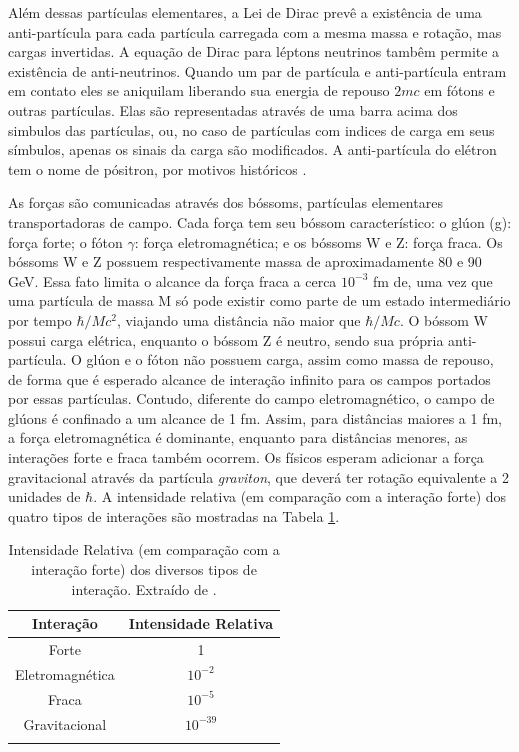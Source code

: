 Além dessas partículas elementares, a Lei de Dirac prevê a
existência de uma anti-partícula para cada partícula carregada
com a mesma massa e rotação, mas cargas invertidas. A equação de Dirac para léptons neutrinos tambêm permite a existência de
anti-neutrinos. Quando um par de partícula e anti-partícula entram em contato
eles se aniquilam liberando sua energia de repouso $2mc$ em fótons e outras
partículas. Elas são representadas através de uma barra acima dos simbulos
das partículas, ou, no caso de partículas com indices de carga em seus símbulos, 
apenas os sinais da carga são modificados. A anti-partícula do elétron tem o nome de pósitron, por motivos
históricos \cite{Intro_Standard}. 

As forças são comunicadas através dos bóssoms, partículas elementares
transportadoras de campo. Cada força tem seu
bóssom característico: o glúon (g): força forte; o fóton $\gamma$: força
eletromagnética; e os bóssoms W e Z: força fraca. 
Os bóssoms W e Z possuem respectivamente massa de aproximadamente
80 e 90 GeV. Essa fato limita o alcance da força fraca a cerca $10^{-3}$ fm de,
uma vez que uma partícula de massa M só pode existir como parte de um estado
intermediário por tempo $\hbar/Mc^2$, viajando uma distância não maior que
$\hbar/Mc$. O bóssom W possui carga elétrica, enquanto o bóssom Z é neutro, sendo sua própria anti-partícula.
O glúon e o fóton não possuem carga, assim como massa de repouso, de forma que é esperado alcance de
interação infinito para os campos portados por essas partículas. 
Contudo, diferente do campo eletromagnético, o campo de
glúons é confinado a um alcance de 1 fm. 
Assim, para distâncias maiores a 1 fm, a força eletromagnética é dominante,
enquanto para distâncias menores, as interações forte e fraca também ocorrem.
Os físicos esperam adicionar a força gravitacional
através da partícula \emph{graviton}, que deverá ter rotação equivalente a 2
unidades de $\hbar$.
A intensidade relativa (em comparação com a interação forte) dos quatro tipos de
interações são mostradas na Tabela \ref{tab:interacoes}.

\begin{table}
\centering
\begin{tabular}{cc}
\hline
\textbf{Interação} & \textbf{Intensidade Relativa} \\
\hline
Forte & 1 \\
Eletromagnética & $10^{-2}$ \\
Fraca & $10^{-5}$ \\
Gravitacional & $10^{-39}$ \\
\hline
\label{tab:interacoes}
\end{tabular}
\caption{Intensidade Relativa (em comparação com a interação forte) dos diversos
tipos de interação. Extraído de \cite{tese_eduardo}.}
\end{table}

